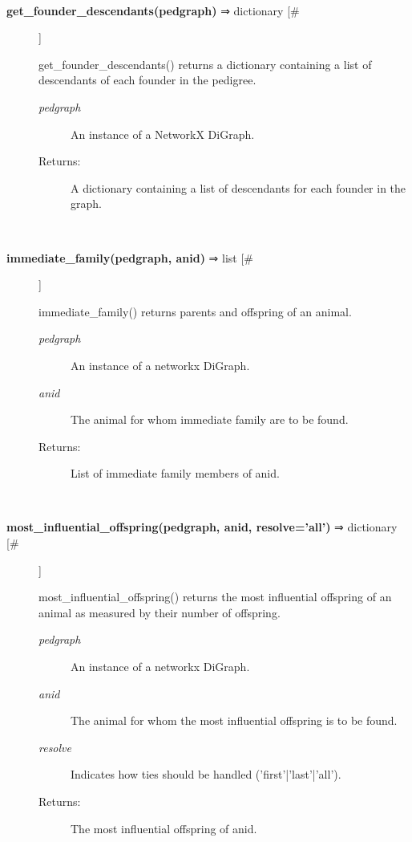 \begin{description}
\begin{description}
\end{description}
\\ 

\item[\textbf{get\_founder\_descendants(pedgraph)}
 ⇒ dictionary [\#]]

 get\_founder\_descendants() returns a dictionary containing a list of descendants of each founder in the pedigree.
\begin{description}
\item[\emph{pedgraph}
] An instance of a NetworkX DiGraph.
\item[Returns:] A dictionary containing a list of descendants for each founder in the graph.

\end{description}
\\ 

\item[\textbf{immediate\_family(pedgraph, anid)}
 ⇒ list [\#]]

 immediate\_family() returns parents and offspring of an animal.
\begin{description}
\item[\emph{pedgraph}
] An instance of a networkx DiGraph.
\item[\emph{anid}
] The animal for whom immediate family are to be found.
\item[Returns:] List of immediate family members of anid.

\end{description}
\\ 

\item[\textbf{most\_influential\_offspring(pedgraph, anid, resolve='all')}
 ⇒ dictionary [\#]]

 most\_influential\_offspring() returns the most influential offspring of an animal as measured by their number of offspring.
\begin{description}
\item[\emph{pedgraph}
] An instance of a networkx DiGraph.
\item[\emph{anid}
] The animal for whom the most influential offspring is to be found.
\item[\emph{resolve}
] Indicates how ties should be handled ('first'|'last'|'all').
\item[Returns:] The most influential offspring of anid.

\end{description}
\\ 


\end{description}
